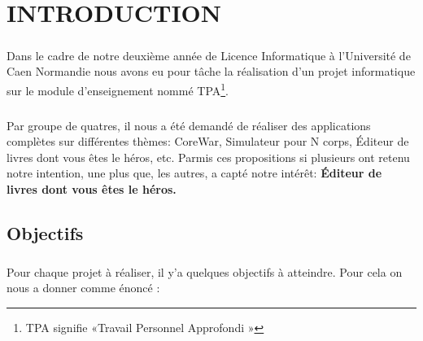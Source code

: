 \documentclass[12pt,a4paper]{article}
\begin{document}
\newpage
\setcounter{page}{1}
\tableofcontents

\thispagestyle{empty}
\setcounter{page}{0}
\newpage
\chapter{INTRODUCTION }
\paragraph{}Dans le cadre de notre deuxième année de Licence Informatique  à l’Université de Caen Normandie nous avons eu pour tâche la réalisation d'un projet informatique sur le module d’enseignement nommé TPA\footnote{TPA signifie «Travail Personnel Approfondi »}. 
\paragraph{}Par groupe de quatres, il nous a été demandé de réaliser des applications complètes sur différentes thèmes: CoreWar, Simulateur pour N corps, Éditeur de livres dont vous êtes le héros, etc. Parmis ces propositions si plusieurs ont retenu notre intention, une plus que, les autres, a capté notre intérêt: \textbf{Éditeur de livres dont vous êtes le héros.}   
\section{Objectifs}
\paragraph{} Pour chaque projet à réaliser, il y'a quelques objectifs à atteindre. Pour cela on nous a donner comme énoncé :
\end{document}
